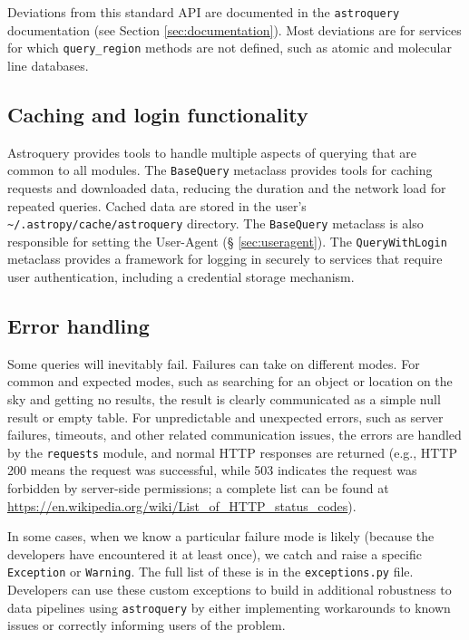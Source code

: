 \documentclass[twocolumn]{aastex62}
\newcommand{\package}[1]{\texttt{#1}\xspace}
\newcommand{\astroquery}{\package{astroquery}}
\begin{document}
Deviations from this standard API are documented in the \astroquery
documentation (see Section \ref{sec:documentation}).  Most deviations
are for services for which \texttt{query\_region} methods are not defined,
such as atomic and molecular line databases.

\subsection{Caching and login functionality}
Astroquery provides tools to handle multiple aspects of querying that are
common to all modules.  The \texttt{BaseQuery} metaclass provides tools for
caching requests and downloaded data, reducing the duration and the network
load for repeated queries.  Cached data are stored in the user's
\texttt{\textasciitilde/.astropy/cache/astroquery} directory.  The
\texttt{BaseQuery} metaclass is also responsible for setting the User-Agent (\S
\ref{sec:useragent}).  The \texttt{QueryWithLogin} metaclass provides a
framework for logging in securely to services that require user
authentication, including a credential storage mechanism.

\subsection{Error handling}
Some queries will inevitably fail.  Failures can take on different modes.  For
common and expected modes, such as searching for an object or location on the
sky and getting no results, the result is clearly communicated as a simple null
result or empty table.  For unpredictable and unexpected errors, such as server
failures, timeouts, and other related communication issues, the errors are handled
by the \texttt{requests} module, and normal HTTP responses are returned (e.g.,
HTTP 200 means the request was successful, while 503 indicates the request
was forbidden by server-side permissions;  a complete list can be found at
\url{https://en.wikipedia.org/wiki/List_of_HTTP_status_codes}).

In some cases, when we know a particular failure mode is likely (because the
developers have encountered it at least once), we catch and raise a specific
\texttt{Exception} or \texttt{Warning}.  The full list of these is in the 
\texttt{exceptions.py} file.  Developers can use these custom exceptions
to build in additional robustness to data pipelines using \astroquery
by either implementing workarounds to known issues or correctly informing
users of the problem.
\end{document}
